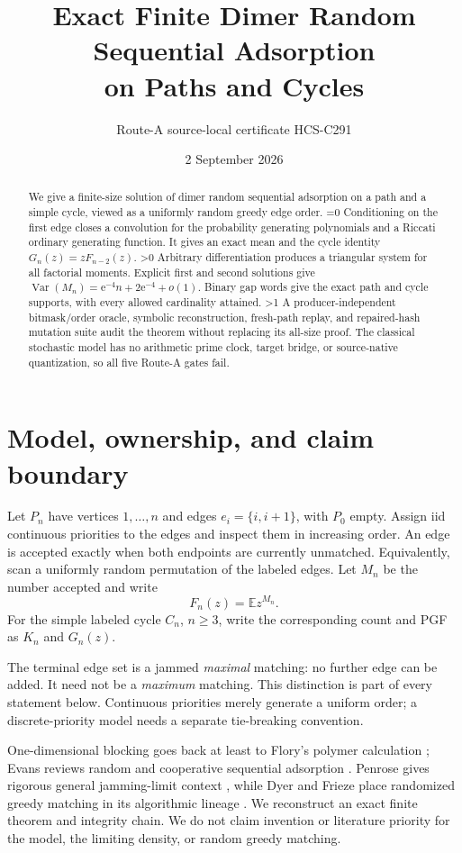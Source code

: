 \documentclass[10pt]{article}
\title{Exact Finite Dimer Random Sequential Adsorption\\
on Paths and Cycles}
\author{Route-A source-local certificate HCS-C291}
\date{2 September 2026}
\providecommand{\CRevisionRound}{2}
\newcommand{\E}{\mathbb E}
\newcommand{\Var}{\operatorname{Var}}
\newcommand{\e}{\mathrm e}
\begin{document}
\maketitle

\begin{abstract}
We give a finite-size solution of dimer random sequential adsorption on a
path and a simple cycle, viewed as a uniformly random greedy edge order.
\ifnum\CRevisionRound=0
Conditioning on the first edge closes a convolution for the probability
generating polynomials and a Riccati ordinary generating function.  It gives
an exact mean and the cycle identity $G_n(z)=zF_{n-2}(z)$.
\fi
\ifnum\CRevisionRound>0
Arbitrary differentiation produces a triangular system for all factorial
moments.  Explicit first and second solutions give
$\Var(M_n)=\e^{-4}n+2\e^{-4}+o(1)$.  Binary gap words give the exact path and
cycle supports, with every allowed cardinality attained.
\fi
\ifnum\CRevisionRound>1
A producer-independent bitmask/order oracle, symbolic reconstruction,
fresh-path replay, and repaired-hash mutation suite audit the theorem without
replacing its all-size proof.  The classical stochastic model has no
arithmetic prime clock, target bridge, or source-native quantization, so all
five Route-A gates fail.
\fi
\end{abstract}

\section{Model, ownership, and claim boundary}
Let $P_n$ have vertices $1,\ldots,n$ and edges
$e_i=\{i,i+1\}$, with $P_0$ empty.  Assign iid continuous priorities to the
edges and inspect them in increasing order.  An edge is accepted exactly when
both endpoints are currently unmatched.  Equivalently, scan a uniformly
random permutation of the labeled edges.  Let $M_n$ be the number accepted and
write
\[
 F_n(z)=\E z^{M_n}.
\]
For the simple labeled cycle $C_n$, $n\ge3$, write the corresponding count and
PGF as $K_n$ and $G_n(z)$.

The terminal edge set is a jammed \emph{maximal} matching: no further edge can
be added.  It need not be a \emph{maximum} matching.  This distinction is part
of every statement below.  Continuous priorities merely generate a uniform
order; a discrete-priority model needs a separate tie-breaking convention.

One-dimensional blocking goes back at least to Flory's polymer calculation
\cite{Flory1939}; Evans reviews random and cooperative sequential adsorption
\cite{Evans1993}.  Penrose gives rigorous general jamming-limit context
\cite{Penrose2001}, while Dyer and Frieze place randomized greedy matching in
its algorithmic lineage \cite{DyerFrieze1991}.  We reconstruct an exact finite
theorem and integrity chain.  We do not claim invention or literature
priority for the model, the limiting density, or random greedy matching.
\end{document}
